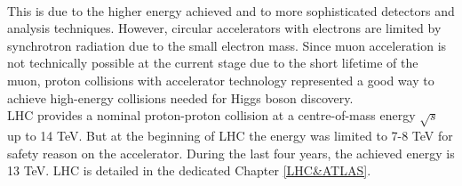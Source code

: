 \\
This is due to the higher energy achieved and to more sophisticated detectors and analysis techniques. However, circular accelerators with electrons are limited by synchrotron radiation due to the small electron mass. Since muon acceleration is not technically possible at the current stage due to the short lifetime of the muon, proton collisions with accelerator technology represented a good way to achieve high-energy collisions needed for Higgs boson discovery. \\
LHC provides a nominal proton-proton collision at a centre-of-mass energy $\sqrt{s}$ up to 14 TeV. But at the beginning of LHC the energy was limited to 7-8 TeV for safety reason on the accelerator. During the last four years, the achieved energy is 13 TeV. LHC is detailed in the dedicated Chapter \ref{LHC&ATLAS}. 
